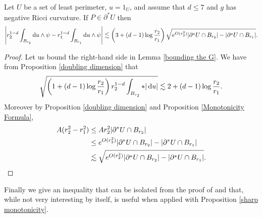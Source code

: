 \begin{proposition}\label{sharp monotonicity}
Let $U$ be a set of least perimeter, $u = 1_U$, and assume that $d \leq 7$ and $g$ has negative Ricci curvature.
If $P \in \partial^* U$ then
\begin{align*}
\left|r_2^{1 - d} \int_{B_{r_2}} \mathop{}\!\mathrm{d} u \wedge \psi - r_1^{1 - d} \int_{B_{r_1}} \mathop{}\!\mathrm{d} u \wedge \psi \right| \lesssim \left(3 + (d - 1) \log \frac{r_2}{r_1}\right) \sqrt{e^{O(r_2^2)}|\partial^* U \cap B_{r_2}| - |\partial^* U \cap B_{r_1}|}.
\end{align*}
\end{proposition}
\begin{proof}
Let us bound the right-hand side in Lemma \ref{bounding the G}.
We have from Proposition \ref{doubling dimension} that
$$\sqrt{\left(1 + (d - 1) \log \frac{r_2}{r_1}\right) r_2^{1 - d} \int_{B_{r_2}} *|\mathop{}\!\mathrm{d} u|} \lesssim 2 + (d - 1) \log \frac{r_2}{r_1}.$$
Moreover by Proposition \ref{doubling dimension} and Proposition \ref{Monotonicity Formula},
\begin{align*}
A(r_2^2 - r_1^2) &\leq Ar_2^2 |\partial^* U \cap B_{r_2}| \\
&\leq e^{O(r_2^2)}|\partial^* U \cap B_{r_2}| - |\partial^* U \cap B_{r_1}| \\
&\lesssim \sqrt{e^{O(r_2^2)}|\partial^* U \cap B_{r_2}| - |\partial^* U \cap B_{r_1}|}. \qedhere
\end{align*}
\end{proof}

Finally we give an inequality that can be isolated from the proof of \cite[Theorem 7.3]{Giusti77} and that, while not very interesting by itself, is useful when applied with Proposition \ref{sharp monotonicity}.

